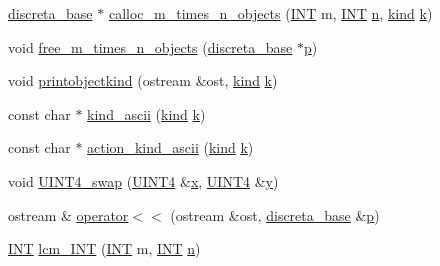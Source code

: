 \begin{DoxyCompactItemize}
\item 
\mbox{\hyperlink{classdiscreta__base}{discreta\+\_\+base}} $\ast$ \mbox{\hyperlink{global_8_c_a7ec05b06a4e54352bb87806136eb485e}{calloc\+\_\+m\+\_\+times\+\_\+n\+\_\+objects}} (\mbox{\hyperlink{galois_8h_a09fddde158a3a20bd2dcadb609de11dc}{I\+NT}} m, \mbox{\hyperlink{galois_8h_a09fddde158a3a20bd2dcadb609de11dc}{I\+NT}} \mbox{\hyperlink{simeon_8_c_a7f2cd26777ce0ff3fdaf8d02aacbddfb}{n}}, \mbox{\hyperlink{discreta_8h_aaf25ee7e2306d78c74ec7bc48f092e81}{kind}} \mbox{\hyperlink{simeon_8_c_a43fa990200c3ddd47c35f151bd4d66bf}{k}})
\item 
void \mbox{\hyperlink{global_8_c_a5a672671f49ca4a2855b0a601f612aef}{free\+\_\+m\+\_\+times\+\_\+n\+\_\+objects}} (\mbox{\hyperlink{classdiscreta__base}{discreta\+\_\+base}} $\ast$\mbox{\hyperlink{alphabet2_8_c_a533391314665d6bf1b5575e9a9cd8552}{p}})
\item 
void \mbox{\hyperlink{global_8_c_a27cf8ea747644760e650c7657d93e723}{printobjectkind}} (ostream \&ost, \mbox{\hyperlink{discreta_8h_aaf25ee7e2306d78c74ec7bc48f092e81}{kind}} \mbox{\hyperlink{simeon_8_c_a43fa990200c3ddd47c35f151bd4d66bf}{k}})
\item 
const char $\ast$ \mbox{\hyperlink{global_8_c_ad0ce825a9f29bc6cec27e1b64cfe27bf}{kind\+\_\+ascii}} (\mbox{\hyperlink{discreta_8h_aaf25ee7e2306d78c74ec7bc48f092e81}{kind}} \mbox{\hyperlink{simeon_8_c_a43fa990200c3ddd47c35f151bd4d66bf}{k}})
\item 
const char $\ast$ \mbox{\hyperlink{global_8_c_af3d3c72d44a9b02194dc182249137e25}{action\+\_\+kind\+\_\+ascii}} (\mbox{\hyperlink{discreta_8h_aaf25ee7e2306d78c74ec7bc48f092e81}{kind}} \mbox{\hyperlink{simeon_8_c_a43fa990200c3ddd47c35f151bd4d66bf}{k}})
\item 
void \mbox{\hyperlink{global_8_c_a164267bed61273806a91cd1bb9c8b579}{U\+I\+N\+T4\+\_\+swap}} (\mbox{\hyperlink{galois_8h_ac94af6544c710549c9fca744fd510395}{U\+I\+N\+T4}} \&\mbox{\hyperlink{alphabet2_8_c_a6150e0515f7202e2fb518f7206ed97dc}{x}}, \mbox{\hyperlink{galois_8h_ac94af6544c710549c9fca744fd510395}{U\+I\+N\+T4}} \&\mbox{\hyperlink{alphabet2_8_c_a0a2f84ed7838f07779ae24c5a9086d33}{y}})
\item 
ostream \& \mbox{\hyperlink{global_8_c_a639e8e03b2612dfa7dbce534edd2fb3d}{operator$<$$<$}} (ostream \&ost, \mbox{\hyperlink{classdiscreta__base}{discreta\+\_\+base}} \&\mbox{\hyperlink{alphabet2_8_c_a533391314665d6bf1b5575e9a9cd8552}{p}})
\item 
\mbox{\hyperlink{galois_8h_a09fddde158a3a20bd2dcadb609de11dc}{I\+NT}} \mbox{\hyperlink{global_8_c_aa1ca76657f1af0f018d20469f9dc2652}{lcm\+\_\+\+I\+NT}} (\mbox{\hyperlink{galois_8h_a09fddde158a3a20bd2dcadb609de11dc}{I\+NT}} m, \mbox{\hyperlink{galois_8h_a09fddde158a3a20bd2dcadb609de11dc}{I\+NT}} \mbox{\hyperlink{simeon_8_c_a7f2cd26777ce0ff3fdaf8d02aacbddfb}{n}})

\end{DoxyCompactItemize}
